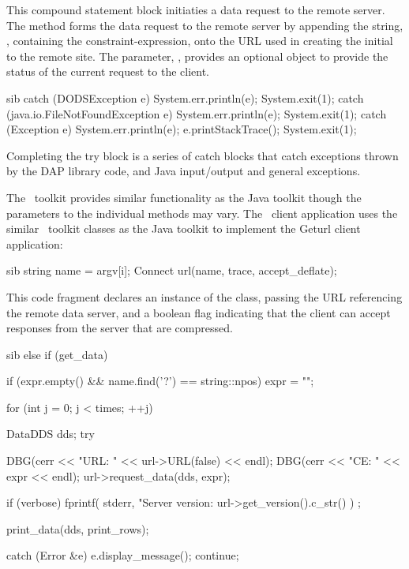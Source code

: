 \documentclass{dods-paper}
\begin{document}
This compound statement block initiaties a data request to the remote
server.  The  method  forms the data
request to the remote server by appending the string, ,
containing the constraint-expression, onto the URL used in creating
the initial  to the remote site.  The parameter,
, provides an optional  object to provide
the status of the current request to the client.

\begin{vcode}{sib} 
 catch (DODSException e) {
   System.err.println(e);
   System.exit(1);
 }
 catch (java.io.FileNotFoundException e) {
   System.err.println(e);
   System.exit(1);
 }
 catch (Exception e) {
   System.err.println(e);
   e.printStackTrace();
   System.exit(1);
 }
\end{vcode}
  
Completing the try block is a series of catch blocks that catch
exceptions thrown by the DAP library code, and Java input/output and
general exceptions.


The \Cpp\ toolkit provides similar functionality as the Java toolkit
though the parameters to the individual  methods may vary.
The \Cpp\ client application 
uses the similar \Cpp\ toolkit classes as the Java toolkit to implement the
Geturl client application:

\begin{vcode}{sib}
  string name = argv[i];
  Connect url(name, trace, accept_deflate);
\end{vcode}

This code fragment declares an instance of the  class,
passing the URL referencing the remote data server, and a boolean
flag indicating that the client can accept responses from the server
that are compressed.

\begin{vcode}{sib}
else if (get_data) {
    if (expr.empty() && name.find('?') == string::npos)
	expr = "";

    for (int j = 0; j < times; ++j) {
	DataDDS dds;
	try {
	    DBG(cerr << "URL: " << url->URL(false) << endl);
	    DBG(cerr << "CE: " << expr << endl);
	    url->request_data(dds, expr);

	    if (verbose)
		fprintf( stderr, "Server version: %
			 url->get_version().c_str() ) ; 

	    print_data(dds, print_rows);
	}
	catch (Error &e) {
	    e.display_message();
	    continue;
	}
    }
}
\end{vcode}
\end{document}
